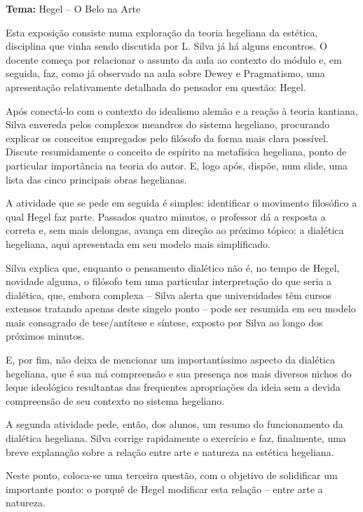 \documentclass[12pt,a4paper]{article}
\begin{document}
	\textbf{Tema:} Hegel -- O Belo na Arte

	Esta exposição consiste numa exploração da teoria hegeliana da 
	estética, disciplina que vinha sendo discutida por L. Silva já 
	há alguns encontros. O docente começa por relacionar o assunto 
	da aula ao contexto do módulo e, em seguida, faz, como já 
	observado na aula sobre Dewey e Pragmatismo, uma apresentação 
	relativamente detalhada do pensador em questão: Hegel. 

	Após conectá-lo com o contexto do idealismo alemão e a reação 
	à teoria kantiana, Silva envereda pelos complexos meandros do 
	sistema hegeliano, procurando explicar os conceitos empregados 
	pelo filósofo da forma mais clara possível. Discute resumidamente 
	o conceito de espírito na metafísica hegeliana, ponto de particular 
	importância na teoria do autor. E, logo após, dispõe, num slide, 
	uma lista das cinco principais obras hegelianas. 

	A atividade que se pede em seguida é simples: identificar o 
	movimento filosófico a qual Hegel faz parte. Passados quatro 
	minutos, o professor dá a resposta a correta e, sem mais delongas, 
	avança em direção ao próximo tópico: a dialética hegeliana, aqui 
	apresentada em seu modelo mais simplificado. 

	Silva explica que, enquanto o pensamento dialético não é, no 
	tempo de Hegel, novidade alguma, o filósofo tem uma particular 
	interpretação do que seria a dialética, que, embora complexa -- 
	Silva alerta que universidades têm cursos extensos tratando 
	apenas deste singelo ponto -- pode ser resumida em seu modelo 
	mais consagrado de tese/antítese e síntese, exposto por Silva 
	ao longo dos próximos minutos. 

	E, por fim, não deixa de mencionar um importantíssimo aspecto 
	da dialética hegeliana, que é sua má compreensão e sua presença 
	nos mais diversos nichos do leque ideológico resultantas das 
	frequentes apropriações da ideia sem a devida compreensão de 
	seu contexto no sistema hegeliano. 

	A segunda atividade pede, então, dos alunos, um resumo do 
	funcionamento da dialética hegeliana. Silva corrige rapidamente 
	o exercício e faz, finalmente, uma breve explanação sobre a 
	relação entre arte e natureza na estética hegeliana. 

	Neste ponto, coloca-se uma terceira questão, com o objetivo 
	de solidificar um importante ponto: o porquê de Hegel 
	modificar esta relação -- entre arte a natureza. 
\end{document}
